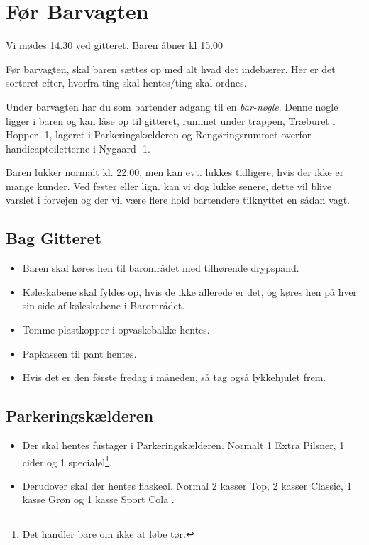 \section{Før Barvagten}
\label{sec:pre-barvagten}

Vi mødes 14.30 ved gitteret. Baren åbner kl 15.00

Før barvagten, skal baren sættes op med alt hvad det indebærer. Her er
det sorteret efter, hvorfra ting skal hentes/ting skal ordnes.

Under barvagten har du som bartender adgang til en \textit{bar-nøgle}. 
Denne nøgle ligger i baren og kan låse op til gitteret, 
rummet under trappen, Træburet i Hopper -1, 
lageret i Parkeringskælderen og Rengøringsrummet overfor handicaptoiletterne i Nygaard -1.

Baren lukker normalt kl. 22:00, men kan evt. lukkes tidligere, hvis der ikke er mange kunder.
Ved fester eller lign. kan vi dog lukke senere, dette vil blive varslet i forvejen og der vil 
være flere hold bartendere tilknyttet en sådan vagt.

\subsection{Bag Gitteret}
\label{sec:pre:bag-ved-gitteret}

\begin{itemize}
	\item Baren skal køres hen til barområdet med tilhørende drypspand.
	\item Køleskabene skal fyldes op, hvis de ikke allerede er det, 
	og køres hen på hver sin side af køleskabene i Barområdet.
	\item Tomme plastkopper i opvaskebakke hentes.
	\item Papkassen til pant hentes.
	\item Hvis det er den første fredag i måneden, så tag også lykkehjulet frem.
\end{itemize}

\subsection{Parkeringskælderen}
\label{sec:pre:hopper}

\begin{itemize}
	\item Der skal hentes fustager i Parkeringskælderen. Normalt 1
	Extra Pilsner, 1 cider og 1 specialøl\footnote[1]{\label{note1}Det handler bare om ikke at løbe
	tør.}.
	\item Derudover skal der hentes flaskeøl. Normal 2 kasser Top, 2 kasser Classic, 
	1 kasse Grøn og 1 kasse Sport Cola \footnotemark[1].
\end{itemize}

